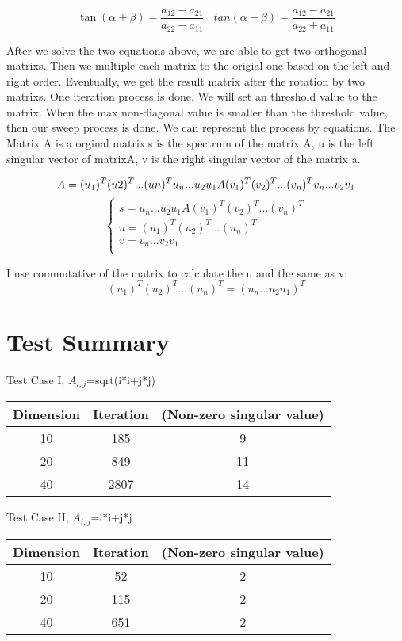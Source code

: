\documentclass[12pts]{article}
\begin{document}
$$
\tan(\alpha+\beta)=\frac{a_{12}+a_{21}}{a_{22}-a_{11}}  ~~~~
tan(\alpha-\beta)=\frac{a_{12}-a_{21}}{a_{22}+a_{11}}  
$$

After we solve the two equations above, we are able to get two orthogonal matrixs. Then we multiple each matrix to the origial one based on the left and right order. Eventually, we get the result matrix after the rotation by two matrixs. One iteration process is done. We will set an threshold value to the matrix. When the max non-diagonal value is smaller than the threshold value, then our sweep process is done. We can represent the process by equations. The Matrix A is a orginal matrix.s is the spectrum of the matrix A, u is the left singular vector of matrixA, v is the right singular vector of the matrix a. 

$$
A=(u_{1})^T(u{2})^T...(u{n})^Tu_{n}...u_{2}u_{1} A (v_{1})^T(v_{2})^T...(v_{n})^Tv_{n}...v_{2}v_{1}\\
$$
$$
\left\{\begin{array}{c}
	s=u_{n}...u_{2}u_{1} A (v_{1})^T(v_{2})^T...(v_{n})^T\\
u=(u_{1})^T(u_{2})^T...(u_{n})^T\\
v=v_{n}...v_{2}v_{1}\\
	   \end{array}\right.
$$

I use commutative of the matrix to calculate the u and the same as v:
$$
(u_{1})^T(u_{2})^T...(u_{n})^T=(u_{n}...u_{2}u_{1})^T
$$

\section{Test Summary}

Test Case I, $A_{i,j}$=sqrt(i*i+j*j)
\begin{center}
    \begin{tabular}{ | c | c | c |}
    \hline
    Dimension&Iteration &(Non-zero singular value) \\ \hline
   10 &185 & 9 \\ \hline
   20&849&11\\ \hline
   40&2807&14	\\ \hline
    \hline
    \end{tabular}
\end{center}

Test Case II, $A_{i,j}$=i*i+j*j
\begin{center}
    \begin{tabular}{ | c | c | c |}
    \hline
    Dimension&Iteration &(Non-zero singular value) \\ \hline
   10 &52 &2 \\ \hline
   20&115&2\\ \hline
   40&651&2	\\ \hline
    \hline
    \end{tabular}
\end{center}
\end{document}
